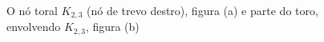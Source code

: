 	
	\begin{figure}[H]
        \centering
        \hfill
        \caption{O nó toral $K_{2,3}$ (nó de trevo destro), figura (a) e parte do toro, envolvendo $K_{2,3}$, figura (b)}
    \end{figure}
	

